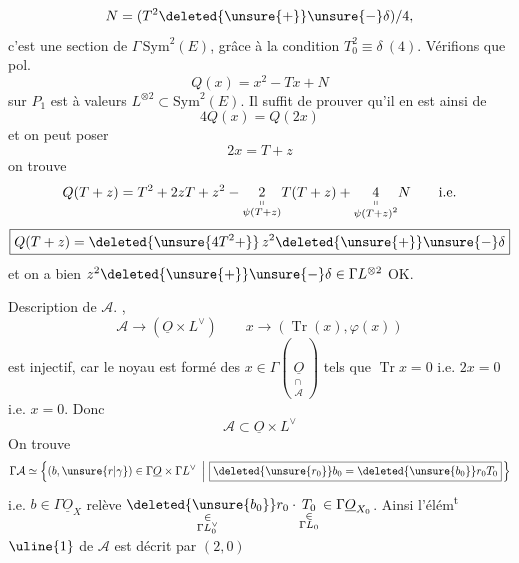 \[
N=(T^2\deleted{\unsure{+}}\unsure{-}\delta)/4,
\]
c'est une section de $\Gamma\,\mathrm{Sym}^2(E)$, grâce à la condition $T_0^2\equiv\delta\ (4)$. Vérifions que   pol.
\[
Q(x)=x^2-Tx+N
\]
sur $P_1$ est à valeurs  $L^{\otimes2}\subset\mathrm{Sym}^2(E)$. Il suffit de prouver qu'il en est ainsi de
\[
4Q(x)=Q(2x)
\]
et on peut poser
\[
2x=T+z
\]
on trouve
\[
Q(T+z)=T^2+2zT+z^2-\underset{\substack{\shortparallel\\\psi(T+z)}}{2}T(T+z)+\underset{\substack{\shortparallel\\\psi(T+z)^2}}{4}N\qquad\text{i.e.}
\]
\[
\boxed{Q(T+z)=\deleted{\unsure{4T^2+}}\,z^2\deleted{\unsure{+}}\unsure{-}\delta}
\]
et on a bien $z^2\deleted{\unsure{+}}\unsure{-}\delta\in\Gamma L^{\otimes2}$ \quad OK.

Description de $\mathcal A$. ,
\[
\mathcal A\longrightarrow(\underline O\times L^\vee)\qquad x\longrightarrow(\operatorname{Tr}(x),\varphi(x))
\]
est injectif, car le noyau est formé des $x\in\Gamma(\underset{\substack{\cap\\\mathcal A}}{\underline O})$ tels que $\operatorname{Tr}x=0$ i.e. $2x=0$ i.e. $x=0$.
Donc
\[
\mathcal A\subset\underline O\times L^\vee
\]
On trouve
\[
\Gamma\mathcal A\simeq\left\{(b,\unsure{r|\gamma})\in\Gamma\underline O\times\Gamma L^\vee\ \left|\ \boxed{\deleted{\unsure{r_0}}b_0=\deleted{\unsure{b_0}}r_0T_0}\right.\right\}
\]
i.e. $b\in\Gamma\underline O_X$ relève $\underset{\substack{\in\\\Gamma L_0^\vee}}{\deleted{\unsure{b_0}}r_0}\cdot\underset{\substack{\in\\\Gamma L_0}}{T_0}\in\Gamma\underline O_{X_0}$.
Ainsi l'élém\textsuperscript{t} $\uline{1}$ de $\mathcal A$ est décrit par $(2,0)$
